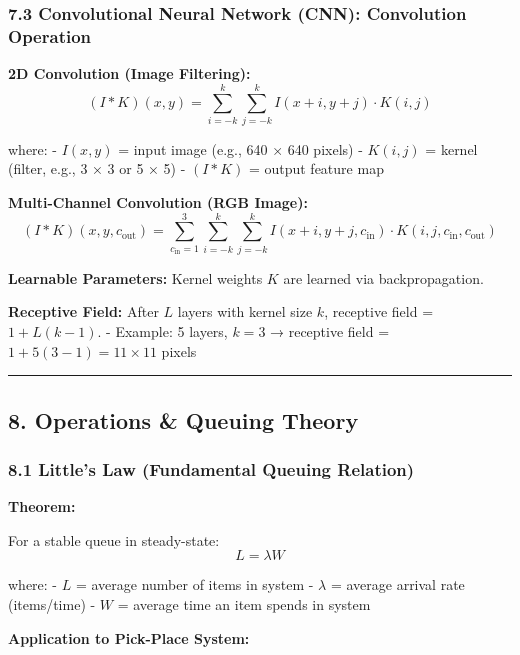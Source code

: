 \documentclass[
]{article}
\begin{document}
\hypertarget{convolutional-neural-network-cnn-convolution-operation}{%
\subsubsection{7.3 Convolutional Neural Network (CNN): Convolution
Operation}\label{convolutional-neural-network-cnn-convolution-operation}}

\textbf{2D Convolution (Image Filtering):} \[
(I * K)(x, y) = \sum_{i=-k}^k \sum_{j=-k}^k I(x + i, y + j) \cdot K(i, j)
\]

where: - \(I(x, y)\) = input image (e.g., 640 × 640 pixels) -
\(K(i, j)\) = kernel (filter, e.g., 3 × 3 or 5 × 5) - \((I * K)\) =
output feature map

\textbf{Multi-Channel Convolution (RGB Image):} \[
(I * K)(x, y, c_{\text{out}}) = \sum_{c_{\text{in}}=1}^3 \sum_{i=-k}^k \sum_{j=-k}^k I(x + i, y + j, c_{\text{in}}) \cdot K(i, j, c_{\text{in}}, c_{\text{out}})
\]

\textbf{Learnable Parameters:} Kernel weights \(K\) are learned via
backpropagation.

\textbf{Receptive Field:} After \(L\) layers with kernel size \(k\),
receptive field = \(1 + L(k - 1)\). - Example: 5 layers, \(k = 3\) →
receptive field = \(1 + 5(3-1) = 11 \times 11\) pixels

\begin{center}\rule{0.5\linewidth}{0.5pt}\end{center}

\hypertarget{operations-queuing-theory}{%
\subsection{8. Operations \& Queuing
Theory}\label{operations-queuing-theory}}

\hypertarget{littles-law-fundamental-queuing-relation}{%
\subsubsection{8.1 Little's Law (Fundamental Queuing
Relation)}\label{littles-law-fundamental-queuing-relation}}

\textbf{Theorem:}

For a stable queue in steady-state: \[
L = \lambda W
\]

where: - \(L\) = average number of items in system - \(\lambda\) =
average arrival rate (items/time) - \(W\) = average time an item spends
in system

\textbf{Application to Pick-Place System:}
\end{document}
